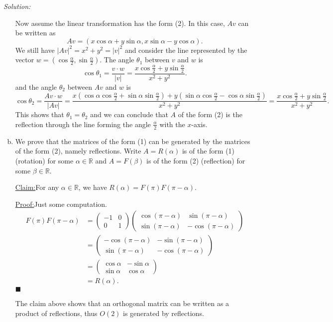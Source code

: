 \documentclass[a4paper, 12pt]{article}
\newenvironment{solution}
    {\textit{Solution:}}
    {}
\newenvironment{claim}[1]{\par\noindent\underline{Claim:}\space#1}{}
\newenvironment{claimproof}[1]{\par\noindent\underline{Proof:}\space#1}{\hfill $\blacksquare$}
\begin{document}
\begin{solution}
\begin{enumerate}[(a)]
Now assume the linear transformation has the form (2). In this case, \(Av\) can be written as 
\[Av=(x\cos \alpha+y\sin \alpha,x\sin \alpha-y\cos \alpha).\]
We still have \(|Av|^2=x^2+y^2=|v|^2\) and consider the line represented by the vector \(w=(\cos \frac{\alpha}{2},\sin \frac{\alpha}{2})\). The angle \(\theta_1\) between \(v\) and \(w\) is 
\[\cos \theta_1=\dfrac{v\cdot w}{|v|}=\dfrac{x\cos \frac{\alpha}{2}+y\sin \frac{\alpha}{2}}{x^2+y^2}.\]
and the angle \(\theta_2\) between \(Av\) and \(w\) is 
\[\cos \theta_2=\dfrac{Av\cdot w}{|Av|}=\dfrac{x(\cos \alpha\cos \frac{\alpha}{2}+\sin \alpha\sin \frac{\alpha}{2})+y(\sin \alpha\cos \frac{\alpha}{2}-\cos \alpha\sin \frac{\alpha}{2})}{x^2+y^2}=\dfrac{x\cos \frac{\alpha}{2}+y\sin \frac{\alpha}{2}}{x^2+y^2}.\]
This shows that \(\theta_1=\theta_2\) and we can conclude that \(A\) of the form (2) is the reflection through the line forming the angle \(\frac{\alpha}{2}\) with the \(x\)-axis.
\item We prove that the matrices of the form (1) can be generated by the matrices of the form (2), namely reflections. Write \(A=R(\alpha)\) is of the form (1) (rotation) for some \(\alpha\in \mathbb{R}\) and \(A=F(\beta)\) is of the form (2) (reflection) for some \(\beta\in \mathbb{R}\). 
\begin{claim}
For any \(\alpha\in \mathbb{R}\), we have \(R(\alpha)=F(\pi)F(\pi-\alpha)\).
\end{claim}
\begin{claimproof}
Just some computation. 
\begin{align*}
            F(\pi)F(\pi-\alpha)&=\begin{pmatrix}
                -1&0\\ 
                0&1
            \end{pmatrix}\begin{pmatrix}
                \cos(\pi-\alpha)&\sin (\pi-\alpha) \\ 
                \sin(\pi-\alpha)&-\cos (\pi-\alpha)
            \end{pmatrix}\\ 
            &=\begin{pmatrix}
                -\cos(\pi-\alpha)& -\sin(\pi-\alpha)\\ 
                \sin(\pi-\alpha)&-\cos (\pi-\alpha)
            \end{pmatrix}\\ 
            &=\begin{pmatrix}
                \cos \alpha&-\sin \alpha\\ 
                \sin \alpha&\cos \alpha
            \end{pmatrix}\\ 
            &=R(\alpha).
\end{align*}
\end{claimproof}

The claim above shows that an orthogonal matrix can be written as a product of reflections, thus \(O(2)\) is generated by reflections.
\end{enumerate}
\end{solution}
\end{document}
